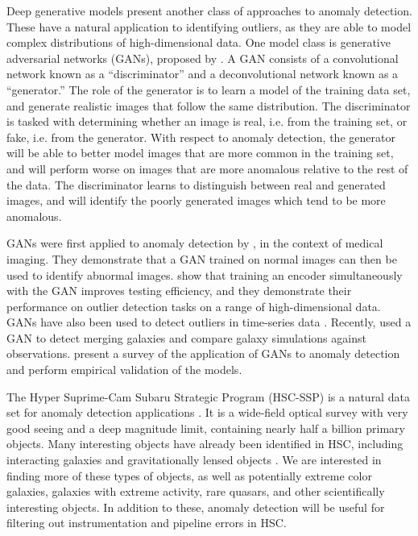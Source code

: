 \documentclass[fleqn,usenatbib,useAMS]{mnras}
\begin{document}
Deep generative models present another class of approaches to anomaly detection.
These have a natural application to identifying outliers, as they are able to model complex distributions of high-dimensional data.
One model class is generative adversarial networks (GANs), proposed by \cite{Goodfellow2014}.
A GAN consists of a convolutional network known as a ``discriminator'' and a deconvolutional network known as a ``generator.'' 
The role of the generator is to learn a model of the training data set, and generate realistic images that follow the same distribution.
The discriminator is tasked with determining whether an image is real, i.e. from the training set, or fake, i.e. from the generator.
With respect to anomaly detection, the generator will be able to better model images that are more common in the training set, and will perform worse on images that are more anomalous relative to the rest of the data.
The discriminator learns to distinguish between real and generated images, and will identify the poorly generated images which tend to be more anomalous.

GANs were first applied to anomaly detection by \cite{Schlegl2017}, in the context of medical imaging.
They demonstrate that a GAN trained on normal images can then be used to identify abnormal images.
\cite{Zenati2018} show that training an encoder simultaneously with the GAN improves testing efficiency, and they demonstrate their performance on outlier detection tasks on a range of high-dimensional data.
GANs have also been used to detect outliers in time-series data \citep{Li2018}.
Recently, \cite{Margalef-Bentabol2020} used a GAN to detect merging galaxies and compare galaxy simulations against observations. 
\cite{DiMattia2019} present a survey of the application of GANs to anomaly detection and perform empirical validation of the models.

The Hyper Suprime-Cam Subaru Strategic Program (HSC-SSP) is a natural data set for anomaly detection applications \citep{Miyazaki2018}.
It is a wide-field optical survey with very good seeing and a deep magnitude limit, containing nearly half a billion primary objects.
Many interesting objects have already been identified in HSC, including interacting galaxies \citep{Goulding2017} and gravitationally lensed objects \citep{Wong2018}.
We are interested in finding more of these types of objects, as well as potentially extreme color galaxies, galaxies with extreme activity, rare quasars, and other scientifically interesting objects.
In addition to these, anomaly detection will be useful for filtering out instrumentation and pipeline errors in HSC.
\end{document}
